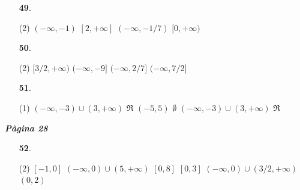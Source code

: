 \documentclass[a4paper, pdf, twoside]{book}
\begin{document}
\begin{multicols}{2}
\begin{enumerate}

 \item[\fontfamily{phv}\selectfont\color{blue}\textbf{49}. ] 
 \begin{tasks}[column-sep=1em, item-indent=1.3333em](2)
	 \task $(-\infty ,-1)$
	 \task $[2,+\infty ]$
	 \task $(-\infty ,-1/7)$
	 \task $[0,+\infty )$
\end{tasks}
\vspace{0.25cm}



 \item[\fontfamily{phv}\selectfont\color{blue}\textbf{50}. ] 
 \begin{tasks}[column-sep=1em, item-indent=1.3333em](2)
	 \task $[3/2,+\infty )$
	 \task $(-\infty ,-9]$
	 \task $(-\infty ,2/7]$
	 \task $(-\infty ,7/2]$
\end{tasks}
\vspace{0.25cm}



 \item[\fontfamily{phv}\selectfont\color{blue}\textbf{51}. ] 
 \begin{tasks}[column-sep=1em, item-indent=1.3333em](1)
	 \task* $(-\infty ,-3)\cup (3,+\infty )$
	 \task $\Re $
	 \task $(-5,5)$
	 \task $\emptyset $
	 \task* $(-\infty ,-3)\cup (3,+\infty )$
	 \task $\Re $
\end{tasks}
 \end{enumerate}
\vspace{0.3cm}


{\textbf{\em Pàgina 28}} \hrulefill
\begin{enumerate}
\vspace{0.25cm}



 \item[\fontfamily{phv}\selectfont\color{blue}\textbf{52}. ] 
 \begin{tasks}[column-sep=1em, item-indent=1.3333em](2)
	 \task $[-1,0]$
	 \task $(-\infty ,0)\cup (5,+\infty )$
	 \task $[0,8]$
	 \task $[0,3]$
	 \task $(-\infty ,0)\cup (3/2,+\infty )$
	 \task $(0,2)$
\end{tasks}
 \end{enumerate}
\begin{enumerate}
\vspace{0.25cm}




\end{enumerate}
\end{multicols}
\end{document}
